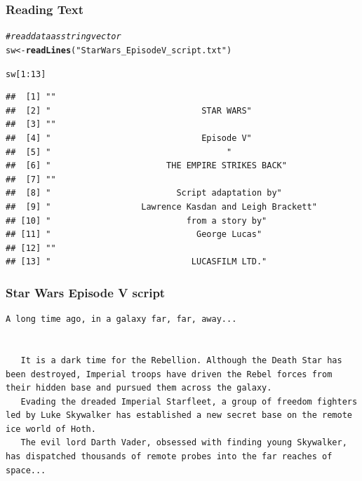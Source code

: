 \documentclass[12pt]{beamer}\usepackage[]{graphicx}\usepackage[]{color}
\makeatletter
\newcommand{\hlnum}[1]{\textcolor[rgb]{0.686,0.059,0.569}{#1}}%
\newcommand{\hlstr}[1]{\textcolor[rgb]{0.192,0.494,0.8}{#1}}%
\newcommand{\hlcom}[1]{\textcolor[rgb]{0.678,0.584,0.686}{\textit{#1}}}%
\newcommand{\hlopt}[1]{\textcolor[rgb]{0,0,0}{#1}}%
\newcommand{\hlstd}[1]{\textcolor[rgb]{0.345,0.345,0.345}{#1}}%
\newcommand{\hlkwb}[1]{\textcolor[rgb]{0.69,0.353,0.396}{#1}}%
\newcommand{\hlkwd}[1]{\textcolor[rgb]{0.737,0.353,0.396}{\textbf{#1}}}%
\newenvironment{kframe}{%
 \def\at@end@of@kframe{}%
 \ifinner\ifhmode%
  \def\at@end@of@kframe{\end{minipage}}%
  \begin{minipage}{\columnwidth}%
 \fi\fi%
 \def\FrameCommand##1{\hskip\@totalleftmargin \hskip-\fboxsep
 \colorbox{shadecolor}{##1}\hskip-\fboxsep
     \hskip-\linewidth \hskip-\@totalleftmargin \hskip\columnwidth}%
 \MakeFramed {\advance\hsize-\width
   \@totalleftmargin\z@ \linewidth\hsize
   \@setminipage}}%
 {\par\unskip\endMakeFramed%
 \at@end@of@kframe}
\newenvironment{knitrout}{}{} %
\makeatother
\begin{document}

\begin{frame}[fragile]
\frametitle{Reading Text}



\begin{knitrout}\footnotesize
{}\color{fgcolor}\begin{kframe}
\begin{alltt}
\hlcom{# read data as string vector}
\hlstd{sw} \hlkwb{<-} \hlkwd{readLines}\hlstd{(}\hlstr{"StarWars_EpisodeV_script.txt"}\hlstd{)}

\hlstd{sw[}\hlnum{1}\hlopt{:}\hlnum{13}\hlstd{]}
\end{alltt}
\end{kframe}
\end{knitrout}

\begin{knitrout}\scriptsize
{}\color{fgcolor}\begin{kframe}
\begin{verbatim}
##  [1] ""                                                    
##  [2] "                              STAR WARS"             
##  [3] ""                                                    
##  [4] "                              Episode V"             
##  [5] "                                   "                 
##  [6] "                       THE EMPIRE STRIKES BACK"      
##  [7] ""                                                    
##  [8] "                         Script adaptation by"       
##  [9] "                  Lawrence Kasdan and Leigh Brackett"
## [10] "                           from a story by"          
## [11] "                             George Lucas"           
## [12] ""                                                    
## [13] "                            LUCASFILM LTD."
\end{verbatim}
\end{kframe}
\end{knitrout}

\end{frame}


\begin{frame}[fragile]
\frametitle{Star Wars Episode V script}

{\scriptsize
\begin{verbatim}
A long time ago, in a galaxy far, far, away...


   It is a dark time for the Rebellion. Although the Death Star has
been destroyed, Imperial troops have driven the Rebel forces from
their hidden base and pursued them across the galaxy.
   Evading the dreaded Imperial Starfleet, a group of freedom fighters
led by Luke Skywalker has established a new secret base on the remote
ice world of Hoth.
   The evil lord Darth Vader, obsessed with finding young Skywalker,
has dispatched thousands of remote probes into the far reaches of
space...
\end{verbatim}
}

\end{frame}
\end{document}
